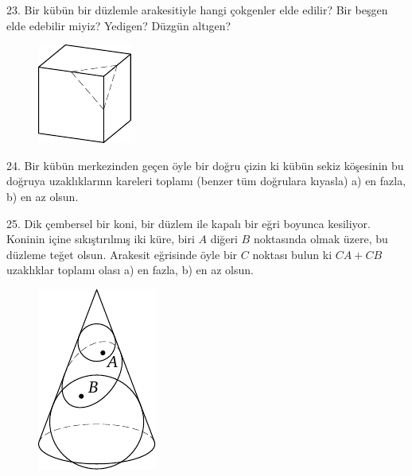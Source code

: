 \begin{problem}{23.}
	Bir kübün bir düzlemle arakesitiyle hangi çokgenler elde edilir? Bir beşgen elde edebilir miyiz? Yedigen? Düzgün altıgen?
	\begin{figure}
		\includegraphics{resources/taskbook-7}
	\end{figure}
\end{problem}

\begin{problem}{24.}
	Bir kübün merkezinden geçen öyle bir doğru çizin ki kübün sekiz köşesinin bu doğruya uzaklıklarınn kareleri toplamı (benzer tüm doğrulara kıyasla) a) en fazla, b) en az olsun.
\end{problem}

\begin{problem}{25.}
	Dik çembersel bir koni, bir düzlem ile kapalı bir eğri boyunca kesiliyor. Koninin içine sıkıştırılmış iki küre, biri $A$ diğeri $B$ noktasında olmak üzere, bu düzleme teğet olsun. Arakesit eğrisinde öyle bir $C$ noktası bulun ki $CA + CB$ uzaklıklar toplamı olası a) en fazla, b) en az olsun.
	\begin{figure}
		\includegraphics{resources/taskbook-9}
	\end{figure}
\end{problem}

